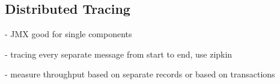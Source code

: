 
\subsection{Distributed Tracing}
- JMX good for single components

- tracing every separate message from start to end, use zipkin

- measure throughput based on separate records or based on transactions

